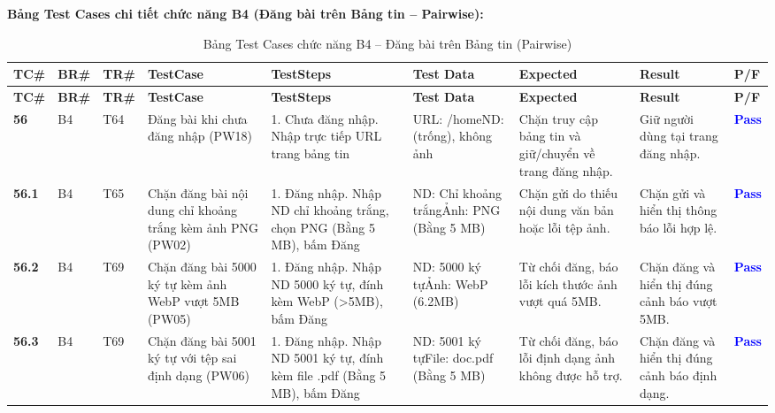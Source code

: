 \documentclass[11pt,a4paper]{article}
\begin{document}
\noindent\textbf{Bảng Test Cases chi tiết chức năng B4 (Đăng bài trên Bảng tin -- Pairwise):}
\begingroup
\scriptsize
\setlength{\tabcolsep}{3pt}
\begin{longtable}{|C{0.85cm}|C{0.7cm}|C{0.95cm}|L{2.0cm}|L{3.0cm}|L{2.2cm}|L{2.6cm}|L{2.5cm}|C{0.85cm}|}
\hline
{}
\textbf{TC\#} & \textbf{BR\#} & \textbf{TR\#} & \textbf{TestCase} & \textbf{TestSteps} & \textbf{Test Data} & \textbf{Expected} & \textbf{Result} & \textbf{P/F} \tabularnewline
\hline
\endfirsthead
\hline
{}
\textbf{TC\#} & \textbf{BR\#} & \textbf{TR\#} & \textbf{TestCase} & \textbf{TestSteps} & \textbf{Test Data} & \textbf{Expected} & \textbf{Result} & \textbf{P/F} \tabularnewline
\hline
\endhead
\hline
\endfoot
\hline
\caption{Bảng Test Cases chức năng B4 -- Đăng bài trên Bảng tin (Pairwise)}
\endlastfoot
\textbf{56} & B4 & T64 & Đăng bài khi chưa đăng nhập (PW18) & 1. Chưa đăng nhập. Nhập trực tiếp URL trang bảng tin & URL: /home\newline ND: (trống), không ảnh & Chặn truy cập bảng tin và giữ/chuyển về trang đăng nhập. & Giữ người dùng tại trang đăng nhập. & \textcolor{blue}{\textbf{Pass}} \\ \hline
\textbf{56.1} & B4 & T65 & Chặn đăng bài nội dung chỉ khoảng trắng kèm ảnh PNG (PW02) & 1. Đăng nhập. Nhập ND chỉ khoảng trắng, chọn PNG (Bằng 5 MB), bấm Đăng & ND: Chỉ khoảng trắng\newline Ảnh: PNG (Bằng 5 MB) & Chặn gửi do thiếu nội dung văn bản hoặc lỗi tệp ảnh. & Chặn gửi và hiển thị thông báo lỗi hợp lệ. & \textcolor{blue}{\textbf{Pass}} \\ \hline
\textbf{56.2} & B4 & T69 & Chặn đăng bài 5000 ký tự kèm ảnh WebP vượt 5MB (PW05) & 1. Đăng nhập. Nhập ND 5000 ký tự, đính kèm WebP (>5MB), bấm Đăng & ND: 5000 ký tự\newline Ảnh: WebP (6.2MB) & Từ chối đăng, báo lỗi kích thước ảnh vượt quá 5MB. & Chặn đăng và hiển thị đúng cảnh báo vượt 5MB. & \textcolor{blue}{\textbf{Pass}} \\ \hline
\textbf{56.3} & B4 & T69 & Chặn đăng bài 5001 ký tự với tệp sai định dạng (PW06) & 1. Đăng nhập. Nhập ND 5001 ký tự, đính kèm file .pdf (Bằng 5 MB), bấm Đăng & ND: 5001 ký tự\newline File: doc.pdf (Bằng 5 MB) & Từ chối đăng, báo lỗi định dạng ảnh không được hỗ trợ. & Chặn đăng và hiển thị đúng cảnh báo định dạng. & \textcolor{blue}{\textbf{Pass}} \\ \hline

\end{longtable}
\end{document}
